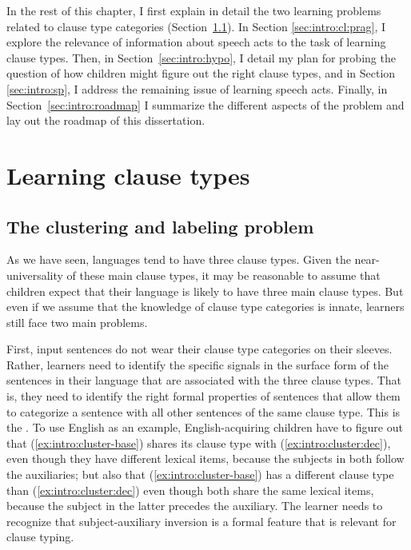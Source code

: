 
In the rest of this chapter, I first explain in detail the two learning problems related to clause type categories (Section~\ref{sec:intro:cl:problem}). In Section \ref{sec:intro:cl:prag}, I explore the relevance of information about speech acts to the task of learning clause types. Then, in Section~\ref{sec:intro:hypo}, I detail my plan for probing the question of how children might figure out the right clause types, and in Section \ref{sec:intro:sp}, I address the remaining issue of learning speech acts. Finally, in Section~\ref{sec:intro:roadmap} I summarize the different aspects of the problem and lay out the roadmap of this dissertation. 

\section{Learning clause types}
\label{sec:intro:cl}
\subsection{The clustering and labeling problem}
\label{sec:intro:cl:problem}

As we have seen, languages tend to have three clause types.  Given the near-universality of these main clause types, it may be reasonable to assume  that children expect that their language is likely to have three main clause types. But even if we assume that the knowledge of clause type categories is innate, learners still face two main problems.

First, input sentences do not wear their clause type categories on their sleeves. Rather, learners need to identify the specific signals in the surface form of the sentences in their language that are associated with the three clause types. That is, they need to identify the right formal properties of sentences that allow them to categorize a sentence with all other sentences of the same clause type. This is the .
To use English as an example, English-acquiring children have to figure out that (\ref{ex:intro:cluster-base}) shares its clause type with (\ref{ex:intro:cluster:dec}), even though they have different lexical items, because the subjects in both follow the auxiliaries; but also that (\ref{ex:intro:cluster-base}) has a different clause type than (\ref{ex:intro:cluster:dec}) even though both share the same lexical items, because the subject in the latter precedes the auxiliary. The learner needs to recognize that subject-auxiliary inversion is a formal feature that is relevant for clause typing.

